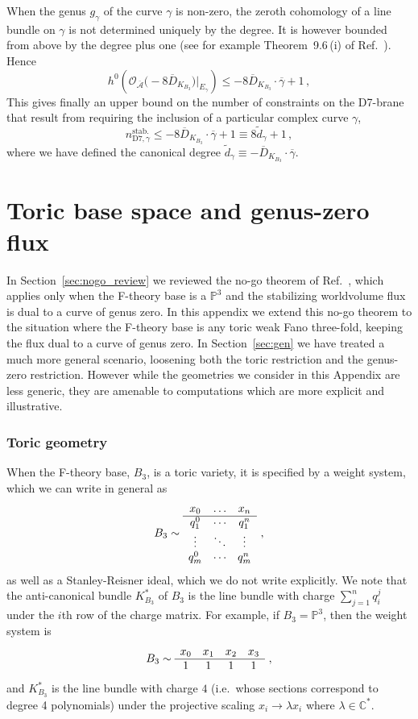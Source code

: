 \documentclass[a4paper,12pt]{article}
\numberwithin{equation}{section}
\newcommand{\mc}{\mathcal}
\newcommand{\mbb}{\mathbb}
\newcommand{\be}{\begin{equation}}
\newcommand{\ee}{\end{equation}}
\newcommand{\fthb}{B_3}				%
\newcommand{\canb}[1]{K_{#1}}			%
\newcommand{\candl}{\overline{D}_{K_{B_3}}}	%
\newcommand{\asl}{\overline{\mc{A}}}	%
\newcommand{\crv}{\gamma}			%
\newcommand{\crvl}{\overline{\gamma}}	%
\newcommand{\degr}[1]{\tilde{d}_{#1}}			%
\newcommand{\stbmod}[1]{n_{\mathrm{D7},{#1}}^\mathrm{stab.}}		%
\begin{document}
When the genus $g_\crv$ of the curve $\crv$ is non-zero, the zeroth cohomology of a line bundle on $\crv$ is not determined uniquely by the degree. It is however bounded from above by the degree plus one (see for example Theorem~9.6\,(i) of Ref.~\cite{BogomolovPetrov2002}). Hence
\be
h^0\left(\mc{O}_{\asl}\big(-8\candl\big)\big|_{E_\crv}\right) \leq -8\candl \cdot \crvl + 1 \,,
\ee
This gives finally an upper bound on the number of constraints on the D7-brane that result from requiring the inclusion of a particular complex curve $\crv$, 
\be
\stbmod{\crv} \leq - 8\candl \cdot \crvl + 1  \equiv 8\degr{\crv} + 1 \,,
\ee
where we have defined the canonical degree $\degr{\crv} \equiv -\candl \cdot \crvl$.


\section{Toric base space and genus-zero flux}

In Section~\ref{sec:nogo_review} we reviewed the no-go theorem of Ref.~\cite{Collinucci:2008pf}, which applies only when the F-theory base is a $\mbb{P}^3$ and the stabilizing worldvolume flux is dual to a curve of genus zero. In this appendix we extend this no-go theorem to the situation where the F-theory base is any toric weak Fano three-fold, keeping the flux dual to a curve of genus zero. In Section~\ref{sec:gen} we have treated a much more general scenario, loosening both the toric restriction and the genus-zero restriction. However while the geometries we consider in this Appendix are less generic, they are amenable to computations which are more explicit and illustrative. 

\subsubsection*{Toric geometry}
\label{app:toric}


When the F-theory base, $\fthb$, is a toric variety, it is specified by a weight system, which we can write in general as
\be
\fthb \sim 
\begin{array}{c c c}
x_0 & \ldots & x_n \\
\hline
q_1^0 & \cdots & q_1^n \\
\vdots & \ddots & \vdots \\
q_m^0 & \cdots & q_m^n 
\end{array} ~,
\label{eq:fthb_ws}
\ee
as well as a Stanley-Reisner ideal, which we do not write explicitly. We note that the anti-canonical bundle $\canb{\fthb}^*$ of $\fthb$ is the line bundle with charge $\sum_{j=1}^n q_i^j$ under the $i$th row of the charge matrix. For example, if $\fthb = \mbb{P}^3$, then the weight system is
\be
\fthb \sim 
\begin{array}{c c c c}
x_0 & x_1 & x_2 & x_3 \\
\hline
1 & 1 & 1 & 1
\end{array} ~,
\ee
and $\canb{\fthb}^*$ is the line bundle with charge $4$ (i.e.\ whose sections correspond to degree 4 polynomials) under the projective scaling $x_i \to \lambda x_i$ where $\lambda \in \mbb{C}^*$.
\end{document}
